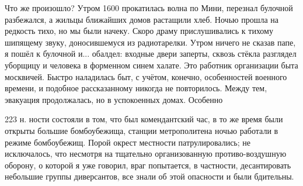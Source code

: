 Что же произошло? Утром 1600 прокатилась волна по Мини, перезнал булочной разбежался, а жильцы ближайших домов растащили хлеб. Ночью прошла на редкость тихо, но мы были начеку. Скоро драму прислушивались к тихому шипящему звуку, доносившемуся из радиотарелки. Утром ничего не сказав папе, я пошёл к булочной и... обалдел: входные двери заперты, сквозь стёкла разглядел уборщицу и человека в форменном синем халате. Это работник организации быта москвичей. Быстро наладилась быт, с учётом, конечно, особенностей военного времени, и подобное рассказанному никогда не повторилось. Между тем, эвакуация продолжалась, но в успокоенных домах. Особенно

223 н.
ности состояли в том, что был комендантский час, в то же время были открыты большие бомбоубежища, станции метрополитена ночью работали в режиме бомбоубежищ. Порой окрест местности патрулировались; не исключалось, что несмотря на тщательно организованную противо-воздушную оборону, о которой я уже говорил, враг попытается, в частности, десантировать небольшие группы диверсантов, все знали об этой опасности и были бдительны.

